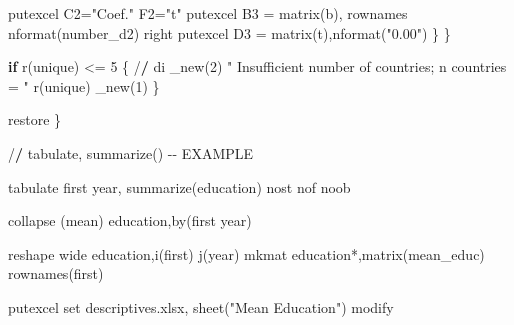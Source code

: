 \documentclass[
  12pt,
]{article}
\newenvironment{Shaded}{\begin{snugshade}}{\end{snugshade}}
\newcommand{\ControlFlowTok}[1]{\textcolor[rgb]{0.13,0.29,0.53}{\textbf{#1}}}
\newcommand{\DecValTok}[1]{\textcolor[rgb]{0.00,0.00,0.81}{#1}}
\newcommand{\ErrorTok}[1]{\textcolor[rgb]{0.64,0.00,0.00}{\textbf{#1}}}
\newcommand{\FunctionTok}[1]{\textcolor[rgb]{0.00,0.00,0.00}{#1}}
\newcommand{\NormalTok}[1]{#1}
\newcommand{\OtherTok}[1]{\textcolor[rgb]{0.56,0.35,0.01}{#1}}
\newcommand{\SpecialCharTok}[1]{\textcolor[rgb]{0.00,0.00,0.00}{#1}}
\newcommand{\StringTok}[1]{\textcolor[rgb]{0.31,0.60,0.02}{#1}}
\begin{document}
\begin{Shaded}
\begin{Highlighting}[]
\NormalTok{                        putexcel C2}\OtherTok{=}\StringTok{"Coef."}\NormalTok{ F2}\OtherTok{=}\StringTok{"t"}
\NormalTok{                        putexcel B3 }\OtherTok{=} \FunctionTok{matrix}\NormalTok{(b), rownames }\FunctionTok{nformat}\NormalTok{(number\_d2) right}
\NormalTok{                        putexcel D3 }\OtherTok{=} \FunctionTok{matrix}\NormalTok{(t),}\FunctionTok{nformat}\NormalTok{(}\StringTok{"0.00"}\NormalTok{)}
\NormalTok{                \}}
\NormalTok{            \}}
            
            \ControlFlowTok{if} \FunctionTok{r}\NormalTok{(unique) }\SpecialCharTok{\textless{}=} \DecValTok{5}\NormalTok{ \{}
                \SpecialCharTok{/}\ErrorTok{/}\NormalTok{ di }\FunctionTok{\_new}\NormalTok{(}\DecValTok{2}\NormalTok{) }\StringTok{" Insufficient number of countries; n countries = "} \FunctionTok{r}\NormalTok{(unique) }\FunctionTok{\_new}\NormalTok{(}\DecValTok{1}\NormalTok{)}
\NormalTok{            \}}
            
\NormalTok{        restore}
\NormalTok{\}}

\SpecialCharTok{/}\ErrorTok{/}\NormalTok{ tabulate, }\FunctionTok{summarize}\NormalTok{() }\SpecialCharTok{{-}{-}}\NormalTok{ EXAMPLE}

\NormalTok{tabulate first year, }\FunctionTok{summarize}\NormalTok{(education) nost nof noob}

\FunctionTok{collapse}\NormalTok{ (mean) education,}\FunctionTok{by}\NormalTok{(first year)}

\NormalTok{reshape wide education,}\FunctionTok{i}\NormalTok{(first) }\FunctionTok{j}\NormalTok{(year)}
\NormalTok{mkmat education}\SpecialCharTok{*}\NormalTok{,}\FunctionTok{matrix}\NormalTok{(mean\_educ) }\FunctionTok{rownames}\NormalTok{(first)}

\NormalTok{putexcel set descriptives.xlsx, }\FunctionTok{sheet}\NormalTok{(}\StringTok{"Mean Education"}\NormalTok{) modify}


\end{Highlighting}
\end{Shaded}
\end{document}
